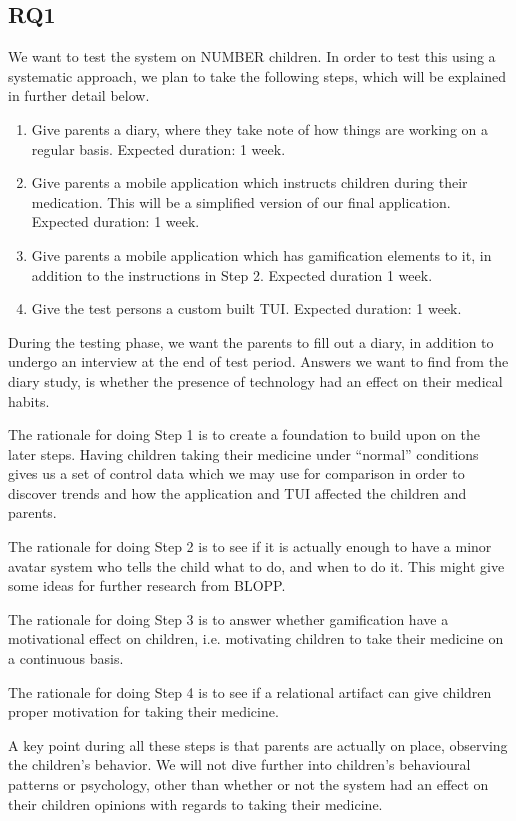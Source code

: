 \subsection{RQ1}
\label{sec:RQ2-methodology}
We want to test the system on NUMBER children. In order to test this using a systematic approach, we plan to take the following steps, which will be explained in further detail below. 
\begin{enumerate}
  \item Give parents a diary, where they take note of how things are working on a regular basis. Expected duration: 1 week.
  \item Give parents a mobile application which instructs children during their medication. This will be a simplified version of our final application. Expected duration: 1 week. 
  \item Give parents a mobile application which has gamification elements to it, in addition to the instructions in Step 2. Expected duration 1 week.   
  \item Give the test persons a custom built TUI. Expected duration: 1 week. 
\end{enumerate}
During the testing phase, we want the parents to fill out a diary, in addition to undergo an interview at the end of test period. Answers we want to find from the diary study, is whether the presence of technology had an effect on their medical habits. 

The rationale for doing Step 1 is to create a foundation to build upon on the later steps. Having children taking their medicine under ``normal'' conditions gives us a set of control data which we may use for comparison in order to discover trends and how the application and TUI affected the children and parents. 

The rationale for doing Step 2 is to see if it is actually enough to have a minor avatar system who tells the child what to do, and when to do it. This might give some ideas for further research from BLOPP. 


The rationale for doing Step 3 is to answer whether gamification have a motivational effect on children, i.e. motivating children to take their medicine on a continuous basis. 

The rationale for doing Step 4 is to see if a relational artifact can give children proper motivation for taking their medicine.

A key point during all these steps is that parents are actually on place, observing the children's behavior. We will not dive further into children's behavioural patterns or psychology, other than whether or not the system had an effect on their children opinions with regards to taking their medicine.       
 
